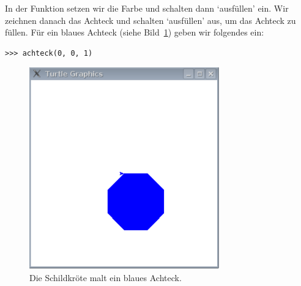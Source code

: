 In der Funktion setzen wir die Farbe und schalten dann `ausfüllen' ein. Wir zeichnen danach das Achteck und schalten `ausfüllen' aus, um das Achteck zu füllen. Für ein blaues Achteck (siehe Bild~\ref{fig49}) geben wir folgendes ein:

\begin{Verbatim}[frame=single]
>>> achteck(0, 0, 1)
\end{Verbatim}

\begin{figure}
\begin{center}
\includegraphics[width=82mm]{images/figure49}
\end{center}
\caption{Die Schildkröte malt ein blaues Achteck.}\label{fig49}
\end{figure}
\newpage
